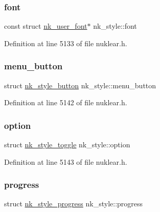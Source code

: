\subsubsection{\texorpdfstring{font}{font}}
{\footnotesize\ttfamily const struct \mbox{\hyperlink{structnk__user__font}{nk\+\_\+user\+\_\+font}}$\ast$ nk\+\_\+style\+::font}



Definition at line 5133 of file nuklear.\+h.

\mbox{\label{structnk__style_af26de9bbb7b4c8a9bd3e722ae41b6433}} 
\subsubsection{\texorpdfstring{menu\+\_\+button}{menu\_button}}
{\footnotesize\ttfamily struct \mbox{\hyperlink{structnk__style__button}{nk\+\_\+style\+\_\+button}} nk\+\_\+style\+::menu\+\_\+button}



Definition at line 5142 of file nuklear.\+h.

\mbox{\label{structnk__style_a12e31b1eff50ff00fc327325ce6cd7f9}} 
\subsubsection{\texorpdfstring{option}{option}}
{\footnotesize\ttfamily struct \mbox{\hyperlink{structnk__style__toggle}{nk\+\_\+style\+\_\+toggle}} nk\+\_\+style\+::option}



Definition at line 5143 of file nuklear.\+h.

\mbox{\label{structnk__style_a8064c6b388f735cff32d4951c6156c9a}} 
\subsubsection{\texorpdfstring{progress}{progress}}
{\footnotesize\ttfamily struct \mbox{\hyperlink{structnk__style__progress}{nk\+\_\+style\+\_\+progress}} nk\+\_\+style\+::progress}



